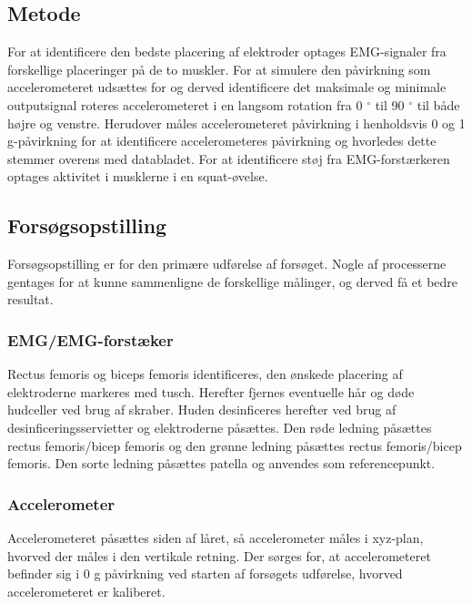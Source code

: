 \subsection{Metode}

For at identificere den bedste placering af elektroder optages EMG-signaler fra forskellige placeringer på de to muskler. 
For at simulere den påvirkning som accelerometeret udsættes for og derved identificere det maksimale og minimale outputsignal roteres accelerometeret i en langsom rotation fra 0 $^{\circ}$ til 90 $^{\circ}$  til både højre og venstre. Herudover måles accelerometeret påvirkning i henholdsvis 0 og 1 g-påvirkning for at identificere accelerometeres påvirkning og hvorledes dette stemmer overens med databladet. 
For at identificere støj fra EMG-forstærkeren optages aktivitet i musklerne i en squat-øvelse.

\subsection{Forsøgsopstilling}
Forsøgsopstilling er for den primære udførelse af forsøget. Nogle af processerne gentages for at kunne sammenligne de forskellige målinger, og derved få et bedre resultat.

\subsubsection{EMG/EMG-forstæker}
Rectus femoris og biceps femoris identificeres, den ønskede placering af elektroderne markeres med tusch. Herefter fjernes eventuelle hår og døde hudceller ved brug af skraber. Huden desinficeres herefter ved brug af desinficeringsservietter og elektroderne påsættes. Den røde ledning påsættes rectus femoris/bicep femoris og den grønne ledning påsættes rectus femoris/bicep femoris. Den sorte ledning påsættes patella og anvendes som referencepunkt.

\subsubsection{Accelerometer}
Accelerometeret påsættes siden af låret, så accelerometer måles i xyz-plan, hvorved der måles i den vertikale retning. Der sørges for,  at accelerometeret befinder sig i 0 g påvirkning ved starten af forsøgets udførelse, hvorved accelerometeret er kaliberet. 

